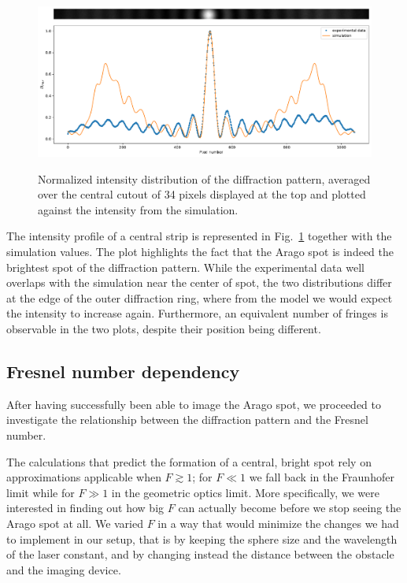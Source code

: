 \documentclass[11pt,a4paper]{article}
\begin{document}
\begin{figure}[h]
    \centering
    \includegraphics[width=\linewidth]{images/Intensity-profile.pdf}
    \label{fig:Intensity profile}
    \caption{Normalized intensity distribution of the diffraction pattern, averaged over the central cutout of 34 pixels displayed at the top and plotted against the intensity from the simulation.}
    \label{fig:Arago-Spot and Intensity profile}
\end{figure}

The intensity profile of a central strip is represented in Fig.~\ref{fig:Arago-Spot and Intensity profile} together with the simulation values. The plot highlights the fact that the Arago spot is indeed the brightest spot of the diffraction pattern. While the experimental data well overlaps with the simulation near the center of spot, the two distributions differ at the edge of the outer diffraction ring, where from the model we would expect the intensity to increase again. Furthermore, an equivalent number of fringes is observable in the two plots, despite their position being different.

\subsection{Fresnel number dependency}
After having successfully been able to image the Arago spot, we proceeded to investigate the relationship between the diffraction pattern and the Fresnel number. 

The calculations that predict the formation of a central, bright spot rely on approximations applicable when \(F \gtrsim 1\); for \(F \ll 1\) we fall back in the Fraunhofer limit while for \(F \gg 1\) in the geometric optics limit.
More specifically, we were interested in finding out how big \(F\) can actually become before we stop seeing the Arago spot at all. We varied \(F\) in a way that would minimize the changes we had to implement in our setup, that is by keeping the sphere size and the wavelength of the laser constant, and by changing instead the distance between the obstacle and the imaging device. 
\end{document}
